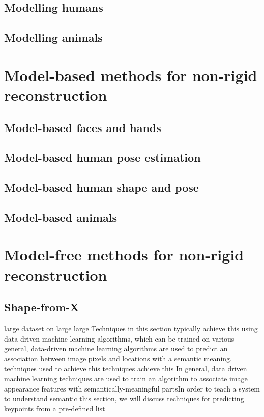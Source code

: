 \subsection{Modelling humans}

\subsection{Modelling animals}

\section{Model-based methods for non-rigid reconstruction}

\subsection{Model-based faces and hands}

\subsection{Model-based human pose estimation}

\subsection{Model-based human shape and pose}

\subsection{Model-based animals}

\section{Model-free methods for non-rigid reconstruction}

\subsection{Shape-from-X}





large dataset on large large Techniques in this section typically achieve this using data-driven machine learning algorithms, which can be trained on various  general, data-driven machine learning algorithms are used to predict an association between image pixels and locations with a semantic meaning. techniques used to achieve this techniques achieve this In general, data driven machine learning techniques are used to train an algorithm to associate image appearance features with semantically-meaningful partsIn order to teach a system to understand semantic this section, we will discuss techniques for predicting keypoints from a pre-defined list

